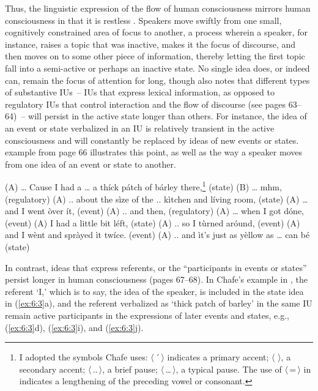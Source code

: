 Thus, the linguistic expression of the flow of human consciousness mirrors human consciousness in that it is restless \citep[66--67]{Chafe1994}. Speakers move swiftly from one small, cognitively constrained area of focus to another, a process wherein a speaker, for instance, raises a topic that was inactive, makes it the focus of discourse, and then moves on to some other piece of information, thereby letting the first topic fall into a semi-active or perhaps an inactive state. No single idea does, or indeed can, remain the focus of attention for long, though \citet[66--67]{Chafe1994} also notes that different types of substantive IUs~-- IUs that express lexical information, as opposed to regulatory IUs that control interaction and the flow of discourse (see pages 63--64)~-- will persist in the active state longer than others. For instance, the idea of an event or state verbalized in an IU is relatively transient in the active consciousness and will constantly be replaced by ideas of new events or states.  example from page 66 illustrates this point, as well as the way a speaker moves from one idea of an event or state to another.

\ea%
    \label{ex:6:3}

\ea(A)  …  Cause I had a … a thíck pátch of bárley there,\footnote{{I adopted the symbols Chafe uses: 〈\,´\,〉 indicates a primary accent; 〈\,{\textasciigrave}\,〉, a secondary accent; 〈\,..\,〉, a brief pause; 〈\,…\,〉, a typical pause. The use of 〈\,=\,〉 in  indicates a lengthening of the preceding vowel or consonant.}}     \hfill (state)
\ex(B)  …   mhm,                      \hfill (regulatory)
\ex(A)  ..     about the sìze of the .. kìtchen and líving room,     \hfill (state)
\ex(A) …   and I went òver ít,                \hfill (event)
\ex(A)  ..     and then,                    \hfill (regulatory)
\ex(A)  …   when I got dóne,                  \hfill (event)
\ex(A) I had a little bit léft,                  \hfill (state)
\ex(A) ..     so I tùrned aróund,                 \hfill (event)
\ex(A) and I wènt and spràyed ìt twíce.            \hfill (event)
\ex(A)  ..     and ìt’s just as yèllow as … can bé          \hfill (state)
\z
\z

\noindent In contrast, ideas that express referents, or the “participants in events or states” persist longer in human consciousness (pages 67--68). In Chafe’s example in , the referent ‘I,’ which is to say, the idea of the speaker, is included in the state idea in (\ref{ex:6:3}a), and the referent verbalized as ‘thick patch of barley’ in the same IU remain active participants in the expressions of later events and states, e.g., (\ref{ex:6:3}d), (\ref{ex:6:3}i), and (\ref{ex:6:3}j).

